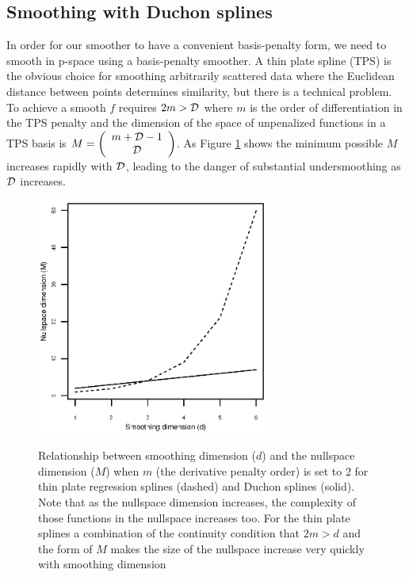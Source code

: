 \documentclass[smallextended]{svjour3}       %
\begin{document}
\subsection{Smoothing with Duchon splines}
\label{ss:duchon}

In order for our smoother to have a convenient basis-penalty form, we need to smooth in p-space using a basis-penalty smoother. A thin plate spline (TPS) is the obvious choice for smoothing arbitrarily scattered data where the Euclidean distance between points determines similarity, but there is a technical problem. To achieve a smooth $f$ requires $2m > {\cal D}$ where $m$ is the order of differentiation in the TPS penalty and the dimension of the space of unpenalized functions in a TPS basis is $M = \left ( \begin{array}{c} m + {\cal D} - 1 \\ {\cal D} \end{array} \right )$. As Figure \ref{nullspace-dim} shows the minimum possible $M$ increases rapidly with $\cal D$, leading to the danger of substantial undersmoothing as $\cal D$ increases.

\begin{figure}
\centering
\includegraphics[width=3in]{Fig2.eps} \\
\caption{Relationship between smoothing dimension ($d$) and the nullspace dimension ($M$) when $m$ (the derivative penalty order) is set to 2 for thin plate regression splines (dashed) and Duchon splines (solid). Note that as the nullspace dimension increases, the complexity of those functions in the nullspace increases too. For the thin plate splines a combination of the continuity condition that $2m>d$ and the form of $M$ makes the size of the nullspace increase very quickly with smoothing dimension}
\label{nullspace-dim}
\end{figure}
\end{document}
